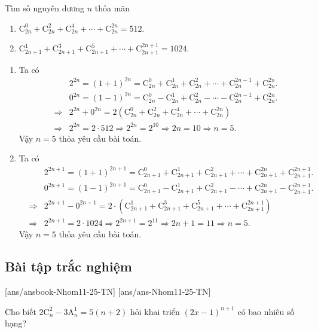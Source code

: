 \begin{bt}%
Tìm số nguyên dương $n$ thỏa mãn
\begin{enumerate}
\item $\mathrm{C}_{2n}^0+\mathrm{C}_{2n}^2+\mathrm{C}_{2n}^4+\cdots +\mathrm{C}_{2n}^{2n}=512$.
\item $\mathrm{C}_{2n+1}^1+\mathrm{C}_{2n+1}^3+\mathrm{C}_{2n+1}^5+\cdots +\mathrm{C}_{2n+1}^{2n+1}=1024$.
\end{enumerate}
\loigiai
{
\begin{enumerate}
\item Ta có
\begin{eqnarray*}
&&2^{2n}=(1+1)^{2n}=\mathrm{C}_{2n}^0+\mathrm{C}_{2n}^1+\mathrm{C}_{2n}^2+\cdots +\mathrm{C}_{2n}^{2n-1}+\mathrm{C}_{2n}^{2n}.\\
&&0^{2n}=(1-1)^{2n}=\mathrm{C}_{2n}^0-\mathrm{C}_{2n}^1+\mathrm{C}_{2n}^2-\cdots -\mathrm{C}_{2n}^{2n-1}+\mathrm{C}_{2n}^{2n}.\\
&\Rightarrow &2^{2n}+0^{2n}=2\left ( \mathrm{C}_{2n}^0+\mathrm{C}_{2n}^2+\mathrm{C}_{2n}^4+\cdots +\mathrm{C}_{2n}^{2n}\right )\\&\Rightarrow &2^{2n}=2\cdot 512\Rightarrow 2^{2n}=2^{10}\Rightarrow 2n=10\Rightarrow n=5.
\end{eqnarray*}
Vậy $n=5$ thỏa yêu cầu bài toán.
\item Ta có
\begin{eqnarray*}
&&2^{2n+1}=(1+1)^{2n+1}=\mathrm{C}_{2n+1}^0+\mathrm{C}_{2n+1}^1+\mathrm{C}_{2n+1}^2+\cdots +\mathrm{C}_{2n+1}^{2n}+\mathrm{C}_{2n+1}^{2n+1}.\\
&&0^{2n+1}=(1-1)^{2n+1}=\mathrm{C}_{2n+1}^0-\mathrm{C}_{2n+1}^1+\mathrm{C}_{2n+1}^2-\cdots +\mathrm{C}_{2n+1}^{2n}-\mathrm{C}_{2n+1}^{2n+1}.\\
&\Rightarrow &2^{2n+1}-0^{2n+1}=2\cdot\left ( \mathrm{C}_{2n+1}^1+\mathrm{C}_{2n+1}^3+\mathrm{C}_{2n+1}^5+\cdots +\mathrm{C}_{2n+1}^{2n+1}\right )\\&\Rightarrow &2^{2n+1}=2\cdot 1024\Rightarrow 2^{2n+1}=2^{11}\Rightarrow 2n+1=11\Rightarrow n=5.
\end{eqnarray*}
Vậy $n=5$ thỏa yêu cầu bài toán.
\end{enumerate}
}
\end{bt}






	\subsection{Bài tập trắc nghiệm}	
	[ans/ansbook-Nhom11-25-TN]
	[ans/ans-Nhom11-25-TN]
	\begin{ex}%
Cho biết $2\mathrm{C}_n^2-3\mathrm{A}_n^1=5(n+2)$ hỏi khai triển $(2x-1)^{n+1}$ có bao nhiêu số hạng?
\end{ex}
	
